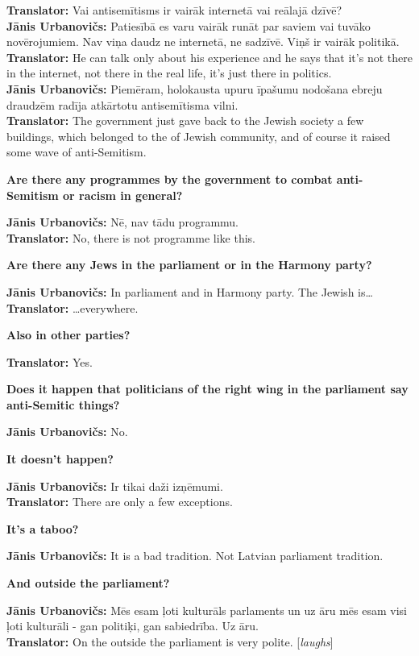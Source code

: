 \textbf{Translator:} Vai antisemītisms ir vairāk internetā vai reālajā dzīvē?\\ 
\textbf{Jānis Urbanovičs:} Patiesībā es varu vairāk runāt par saviem vai tuvāko novērojumiem. Nav viņa daudz ne internetā, ne sadzīvē. Viņš ir vairāk politikā. \\
\textbf{Translator:} He can talk only about his experience and he says that it's not there in the internet, not there in the real life, it’s just there in politics.\\ 
\textbf{Jānis Urbanovičs:} Piemēram, holokausta upuru īpašumu nodošana ebreju draudzēm radīja atkārtotu antisemītisma vilni.\\
\textbf{Translator:} The government just gave back to the Jewish society a few buildings, which belonged to the of Jewish community, and of course it raised some wave of anti-Semitism.  

\textbf{Are there any programmes by the government to combat anti-Semitism or racism in general?}  

\textbf{Jānis Urbanovičs:} Nē, nav tādu programmu.\\
\textbf{Translator:} No, there is not programme like this.

\textbf{Are there any Jews in the parliament or in the Harmony party?}  

\textbf{Jānis Urbanovičs:} In parliament and in Harmony party. The Jewish is… 
\textbf{Translator:} …everywhere. 

\textbf{Also in other parties?}  

\textbf{Translator:} Yes. 

\textbf{Does it happen that politicians of the right wing in the parliament say anti-Semitic things?}  

\textbf{Jānis Urbanovičs:} No.  

\textbf{It doesn't happen?} 

\textbf{Jānis Urbanovičs:} Ir tikai daži izņēmumi.\\  
\textbf{Translator:} There are only a few exceptions.  

\textbf{It's a taboo?} 

\textbf{Jānis Urbanovičs:} It is a bad tradition. Not Latvian parliament tradition. 

\textbf{And outside the parliament?}  

\textbf{Jānis Urbanovičs:} Mēs esam ļoti kulturāls parlaments un uz āru mēs esam visi ļoti kulturāli - gan politiķi, gan sabiedrība. Uz āru.\\  
\textbf{Translator:} On the outside the parliament is very polite. [\textit{laughs}] 

